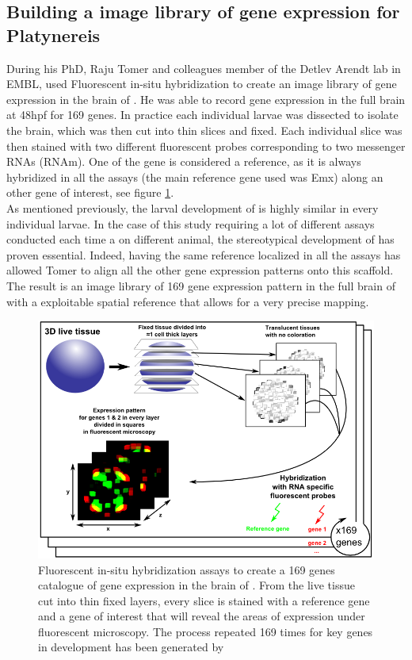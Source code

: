      \subsection{Building a image library of gene expression for Platynereis}
     During his PhD, Raju Tomer and colleagues  member of the Detlev Arendt lab in EMBL, used Fluorescent in-situ hybridization to create an image library of gene expression in the brain of \platy{}. He was able to record gene expression in the full brain at 48hpf for 169 genes. In practice each individual larvae was dissected to isolate the brain, which was then cut into thin slices and fixed. Each individual slice was then stained with two different fluorescent probes corresponding to two messenger RNAs (RNAm). One of the gene is considered a reference, as it is always hybridized in all the assays (the main reference gene used was Emx) along an other gene of interest, see figure \ref{fig:insitu}.\\
     
     As mentioned previously, the larval development of \platy{} is highly similar in every individual larvae. In the case of this study requiring a lot of different assays conducted each time a on different animal, the stereotypical development of \platy{} has proven essential. Indeed, having the same reference localized in all the assays has allowed Tomer to align all the other gene expression patterns onto this scaffold.\\
     
     The result is an image library of 169 gene expression pattern in the full brain of \platy{} with a exploitable spatial reference that allows for a very precise mapping.
    
    \begin{figure}[bth]
\centerline{\includegraphics[width=0.9\linewidth]{gfx/chapter1/insitu.png}}
\caption{Fluorescent in-situ hybridization assays to create a 169 genes catalogue of gene expression in the brain of \platy{}. From the live tissue cut into thin fixed layers, every slice is stained with a reference gene and a gene of interest that will reveal the areas of expression under fluorescent microscopy. The process repeated 169 times for key genes in \platy{} development has been generated by \cite{Tomer10}}\label{fig:insitu}
	\end{figure}
	
